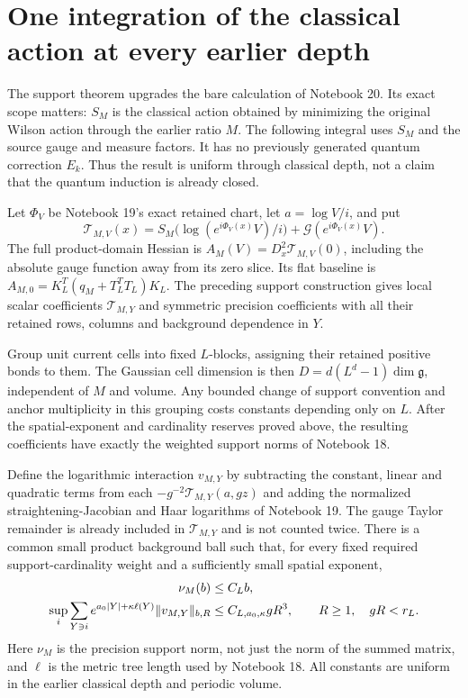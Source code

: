 \section{One integration of the classical action at every earlier depth}
\label{ci-section}

The support theorem upgrades the bare calculation of Notebook 20.
Its exact scope matters: $S_M$ is the classical action obtained
by minimizing the original Wilson action through the earlier
ratio $M$. The following integral uses $S_M$ and the source
gauge and measure factors. It has no previously generated
quantum correction $E_k$. Thus the result is uniform through
classical depth, not a claim that the quantum induction is
already closed.

Let $\Phi_V$ be Notebook 19's exact retained chart, let
$a=\log V/i$, and put
\begin{equation}\label{ci-action}
 \mathcal T_{M,V}(x)=
 S_M\bigl(\log(e^{i\Phi_V(x)}V)/i\bigr)
                    +\mathcal G(e^{i\Phi_V(x)}V).
\end{equation}
The full product-domain Hessian is
$A_M(V)=D_x^2\mathcal T_{M,V}(0)$, including the absolute
gauge function away from its zero slice. Its flat baseline is
$A_{M,0}=K_L^T(q_M+T_L^TT_L)K_L$.
The preceding support construction gives local scalar
coefficients $\mathcal T_{M,Y}$ and symmetric precision
coefficients with all their retained rows, columns and
background dependence in $Y$.

Group unit current cells into fixed $L$-blocks, assigning their
retained positive bonds to them. The Gaussian cell dimension
is then $D=d(L^d-1)\dim\mathfrak g$, independent of $M$ and
volume. Any bounded change of support convention and anchor
multiplicity in this grouping costs constants depending only
on $L$. After the spatial-exponent and cardinality reserves
proved above, the resulting coefficients have exactly the
weighted support norms of Notebook 18.

Define the logarithmic interaction $v_{M,Y}$ by subtracting
the constant, linear and quadratic terms from each
$-g^{-2}\mathcal T_{M,Y}(a,gz)$ and adding the normalized
straightening-Jacobian and Haar logarithms of Notebook 19.
The gauge Taylor remainder is already included in
$\mathcal T_{M,Y}$ and is not counted twice. There is a
common small product background ball such that, for every
fixed required support-cardinality weight and a sufficiently
small spatial exponent,
\begin{align}
 \nu_M(b)&\le C_L b,\label{ci-inputs}\\
 \sup_i\sum_{Y\ni i}e^{a_0|Y|+\kappa\ell(Y)}
                      \|v_{M,Y}\|_{b,R}
       &\le C_{L,a_0,\kappa}gR^3,
       \qquad R\ge1,\quad gR<r_L.\notag
\end{align}
Here $\nu_M$ is the precision support norm, not just the
norm of the summed matrix, and $\ell$ is the metric tree
length used by Notebook 18. All constants are uniform in
the earlier classical depth and periodic volume.

